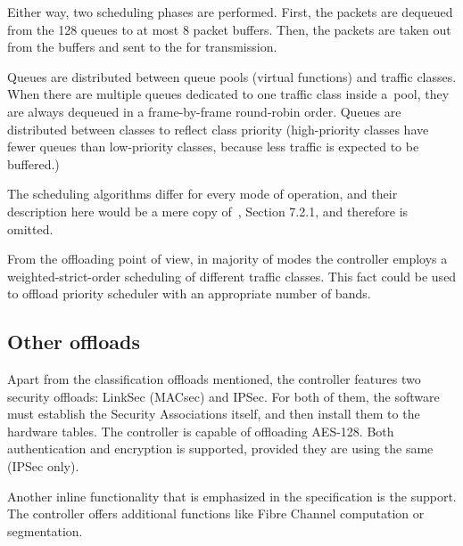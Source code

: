 Either way, two scheduling phases are performed. First, the packets are
dequeued from the 128 queues to at most 8 packet buffers. Then, the packets are
taken out from the buffers and sent to the  for transmission.

Queues are distributed between queue pools (virtual functions) and traffic
classes. When there are multiple queues dedicated to one traffic class inside
a~pool, they are always dequeued in a frame-by-frame round-robin order. Queues
are distributed between classes to reflect class priority 
(high-priority classes have fewer queues than low-priority classes, because less
traffic is expected to be buffered.)

The scheduling algorithms differ for every mode of operation, and their
description here would be a mere copy of~\cite{82599}, Section 7.2.1, and
therefore is omitted.

From the offloading point of view, in majority of modes the controller employs
a weighted-strict-order scheduling of different traffic classes. This fact
could be used to offload priority scheduler with an appropriate number of bands.

\subsection{Other offloads}

Apart from the classification offloads mentioned, the controller features two
security offloads: LinkSec (MACsec) and IPSec. For both of them, the software
must establish the Security Associations itself, and then install them to the
hardware tables. The controller is capable of offloading AES-128. Both
authentication and encryption is supported, provided they are using the same
 (IPSec only). 

Another inline functionality that is emphasized in the specification is the
 support. The controller offers additional functions like Fibre
Channel  computation or  segmentation. 
